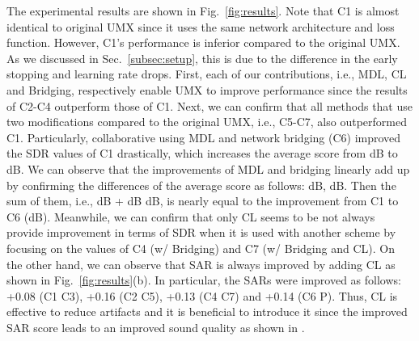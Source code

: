 \documentclass{article}
\begin{document}
The experimental results are shown in Fig.~\ref{fig:results}.
Note that C1 is almost identical to original UMX since it uses the same network architecture and loss function.
However, C1's performance is inferior compared to the original UMX.
As we discussed in Sec.~\ref{subsec:setup}, this is due to the difference in the early stopping and learning rate drops.
First, each of our contributions, i.e., MDL, CL and Bridging, respectively enable UMX to improve performance since the results of C2-C4 outperform those of C1.
Next, we can confirm that all methods that use two modifications compared to the original UMX, i.e., C5-C7, also outperformed C1.
Particularly, collaborative using MDL and network bridging (C6) improved the SDR values of C1 drastically, which increases the average score from dB to dB.
We can observe that the improvements of MDL and bridging linearly add up by confirming the differences of the average score as follows:
dB, dB. 
Then the sum of them, i.e., dB + dB dB, is nearly equal to the improvement from C1 to C6 (dB).
Meanwhile, we can confirm that only CL seems to be not always provide improvement in terms of SDR when it is used with another scheme by focusing on the values of C4 (w/ Bridging) and C7 (w/ Bridging and CL).
On the other hand, we can observe that SAR is always improved by adding CL as shown in Fig.~\ref{fig:results}(b).
In particular, the SARs were improved as follows: +0.08 (C1  C3), +0.16 (C2  C5), +0.13 (C4  C7) and +0.14 (C6  P).
Thus, CL is effective to reduce artifacts and it is beneficial to introduce it since the improved SAR score leads to an improved sound quality as shown in \cite{ward2018bss}.
\end{document}
